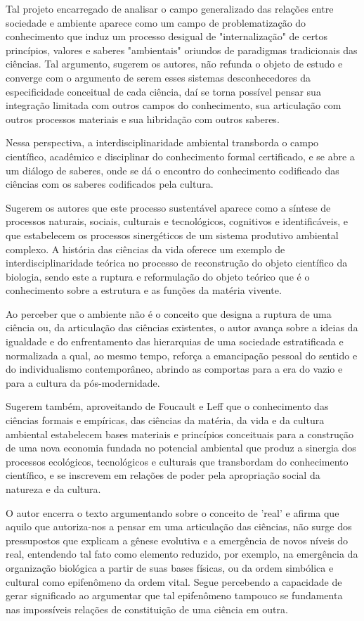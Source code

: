 \documentclass[
   article,       %
   12pt,          %
   oneside,       %
   a4paper,       %
   english,       %
   brazil,           %
   sumario=tradicional
   ]{abntex2}
\begin{document}
Tal projeto encarregado de analisar o campo generalizado das relações entre sociedade e ambiente aparece como um campo de problematização do conhecimento que induz um processo desigual de "internalização" de certos princípios, valores e saberes "ambientais" oriundos de paradigmas tradicionais das ciências. Tal argumento, sugerem os autores, não refunda o objeto de estudo e converge com o argumento de serem esses sistemas desconhecedores da especificidade conceitual de cada ciência, daí se torna possível pensar sua integração limitada com outros campos do conhecimento, sua articulação com outros processos materiais e sua hibridação com outros saberes.

Nessa perspectiva, a interdisciplinaridade ambiental transborda o campo científico, acadêmico e disciplinar do conhecimento formal certificado, e se abre a um diálogo de saberes, onde se dá o encontro do conhecimento codificado das ciências com os saberes codificados pela cultura.

Sugerem os autores que este processo sustentável aparece como a síntese de processos naturais, sociais, culturais e tecnológicos, cognitivos e identificáveis, e que estabelecem os processos sinergéticos de um sistema produtivo ambiental complexo. A história das ciências da vida oferece um exemplo de interdisciplinaridade teórica no processo de reconstrução do objeto científico da biologia, sendo este a ruptura e reformulação do objeto teórico que é o conhecimento sobre a estrutura e as funções da matéria vivente.

Ao perceber que o ambiente não é o conceito que designa a ruptura de uma ciência ou, da articulação das ciências existentes, o autor avança sobre a ideias da igualdade e do enfrentamento das hierarquias de uma sociedade estratificada e normalizada a qual, ao mesmo tempo, reforça a emancipação pessoal do sentido e do individualismo contemporâneo, abrindo as comportas para a era do vazio e para a cultura da pós-modernidade. 

Sugerem também, aproveitando de Foucault e Leff que o conhecimento das ciências formais e empíricas, das ciências da matéria, da vida e da cultura ambiental estabelecem bases materiais e princípios conceituais para a construção de uma nova economia fundada no potencial ambiental que produz a sinergia dos processos ecológicos, tecnológicos e culturais que transbordam do conhecimento científico, e se inscrevem em relações de poder pela apropriação social da natureza e da cultura.

O autor encerra o texto argumentando sobre o conceito de 'real' e afirma que aquilo que autoriza-nos a pensar em uma articulação das ciências, não surge dos pressupostos que explicam a gênese evolutiva e a emergência de novos níveis do real, entendendo tal fato como elemento reduzido, por exemplo, na emergência da organização biológica a partir de suas bases físicas, ou da ordem simbólica e cultural como epifenômeno da ordem vital. Segue percebendo a capacidade de gerar significado ao argumentar que tal epifenômeno tampouco se fundamenta nas impossíveis relações de constituição de uma ciência em outra. 
\end{document}
